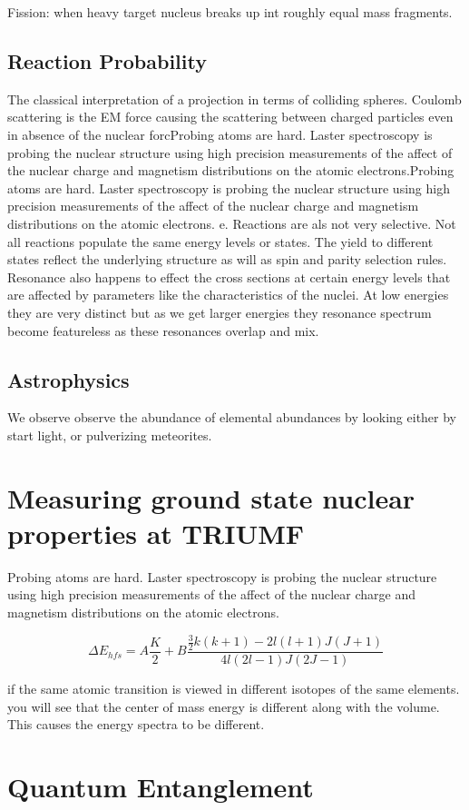\documentclass[english, 11pt]{article}
\begin{document}
Fission: when heavy target nucleus breaks up int roughly equal mass fragments.

\subsection{Reaction Probability} %
\label{sub:reaction_rop}

The classical interpretation of a projection in terms of colliding spheres. Coulomb scattering is the EM force causing the scattering between charged particles even in absence of the nuclear forcProbing atoms are hard. Laster spectroscopy is probing the nuclear structure using high precision measurements of the affect of the nuclear charge and magnetism distributions on the atomic electrons.Probing atoms are hard. Laster spectroscopy is probing the nuclear structure using high precision measurements of the affect of the nuclear charge and magnetism distributions on the atomic electrons.  e. Reactions are als not very selective. Not all reactions populate the same energy levels or states. The yield to different states reflect the underlying structure as will as spin and parity selection rules. Resonance also happens to effect the cross sections at certain energy levels that are affected by parameters like the characteristics of the nuclei. At low energies they are very distinct but as we get larger energies they resonance spectrum become featureless as these resonances overlap and mix.

\subsection{Astrophysics} %
\label{sub:astrophysics}

We observe observe the abundance of elemental abundances by looking either by start light, or pulverizing meteorites.

\section{Measuring ground state nuclear properties at TRIUMF}

Probing atoms are hard. Laster spectroscopy is probing the nuclear structure using high precision measurements of the affect of the nuclear charge and magnetism distributions on the atomic electrons.

\[\Delta E_{hfs} = A\frac{K}{2} + B\frac{\frac{3}{2}k(k+1) - 2l(l+1)J(J+1)}{4l(2l-1)J(2J-1)}\]

if the same atomic transition is viewed in different isotopes of the same elements. you will see that the center of mass energy is different along with the volume. This causes the energy spectra to be different.

\section{Quantum Entanglement}
\end{document}

